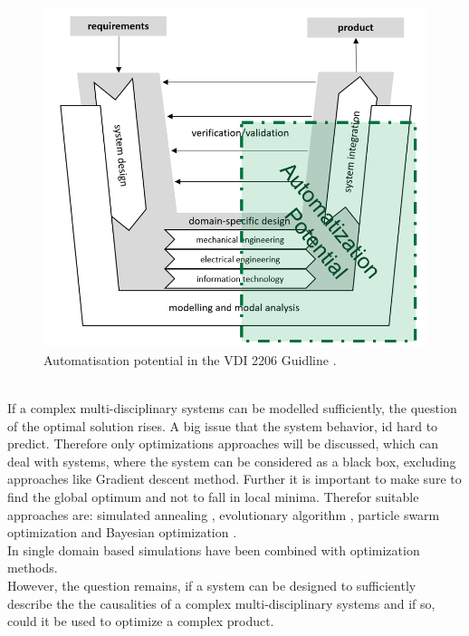 \begin{figure}[h]
    \centering
    \includegraphics[scale=0.4]{pics/VDI_2206.PNG}
    \caption{\label{pic:VDI2206} Automatisation potential in the VDI 2206 Guidline \cite{Jansch2006THEDO}.}
\end{figure}\\
If a complex multi-disciplinary systems can be modelled sufficiently, the question of the optimal solution rises.
A big issue that the system behavior, id hard to predict.
Therefore only optimizations approaches will be discussed, which can deal with systems,
where the system can be considered as a black box, excluding approaches like Gradient descent method.
Further it is important to make sure to find the global optimum and not to fall in local minima.
Therefor suitable approaches are: simulated annealing \cite{khachaturyan_thermodynamic_1981}, 
evolutionary algorithm \cite{wu_ensemble_2019}, particle swarm optimization \cite{Kennedy1995} and Bayesian optimization \cite{marcuk_optimization_1975}.\\
In \cite{hornby_automated_2006, khalafallah_electimize_2011, evans_aerodynamic_2017, slagter_perform_2020}
single domain based simulations have been combined with optimization methods.\\
However, the question remains, if a system can be designed to sufficiently describe the  
the causalities of a complex multi-disciplinary systems and if so, 
could it be used to optimize a complex product.